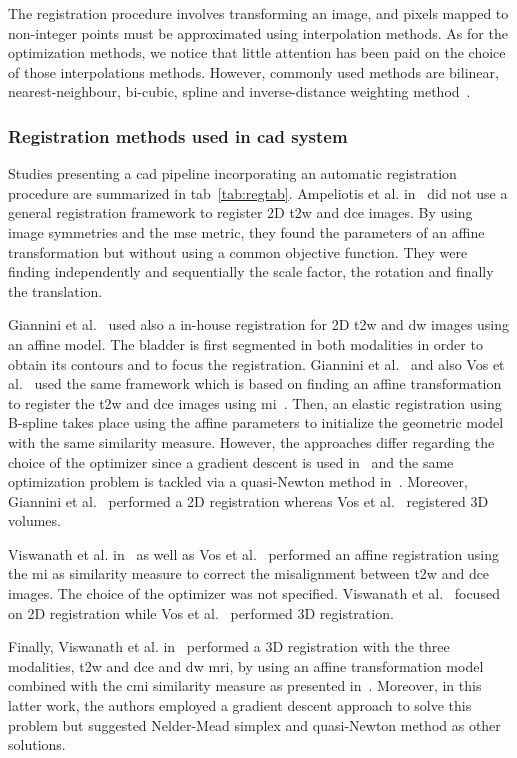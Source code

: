 The registration procedure involves transforming an image, and pixels mapped to non-integer points must be approximated using interpolation methods. As for the optimization methods, we notice that little attention has been paid on the choice of those interpolations methods. However, commonly used methods are bilinear, nearest-neighbour, bi-cubic, spline and inverse-distance weighting method~\cite{Mitra2012}.

\subsubsection{Registration methods used in \ac{cad} system}\label{subsubsec:regrev}

Studies presenting a \ac{cad} pipeline incorporating an automatic registration procedure are summarized in \ac{tab}~\ref{tab:regtab}. 
Ampeliotis et al. in~\cite{Ampeliotis2007,Ampeliotis2008} did not use a general registration framework  to register 2D \ac{t2w} and \ac{dce} images. By using image symmetries and the \ac{mse} metric, they found the parameters of an affine transformation but without using a common objective function. They were finding independently and sequentially the scale factor, the rotation and finally the translation.

Giannini et al.~\cite{Giannini2013} used also a in-house registration for 2D \ac{t2w} and \ac{dw} images using an affine model. The bladder is first segmented in both modalities in order to obtain its contours and to focus the registration.
Giannini et al.~\cite{Giannini2013} and also Vos et al.~\cite{Vos2010} used the same framework which is based on finding an affine transformation to register the \ac{t2w} and \ac{dce} images using \ac{mi}~\cite{Rueckert1999}. Then, an elastic registration using B-spline takes place using the affine parameters to initialize the geometric model with the  same similarity measure. However, the approaches differ regarding the choice of the optimizer since a gradient descent is used in~\cite{Giannini2013} and the same optimization problem is tackled via a quasi-Newton method in~\cite{Vos2010}. Moreover, Giannini et al.~\cite{Giannini2013} performed a 2D registration whereas Vos et al.~\cite{Vos2010} registered 3D volumes.

Viswanath et al. in~\cite{Viswanath2008a,Viswanath2009} as well as Vos et al.~\cite{Vos2008} performed an affine registration using the \ac{mi} as similarity measure to correct the misalignment between \ac{t2w} and \ac{dce} images. The choice of the optimizer was not specified. Viswanath et al.~\cite{Viswanath2008a,Viswanath2009} focused on 2D registration while Vos et al.~\cite{Vos2008} performed 3D registration.

Finally, Viswanath et al. in~\cite{Viswanath2011} performed a 3D registration with the three modalities, \ac{t2w} and \ac{dce} and \ac{dw} \ac{mri}, by using an affine transformation model combined with the \ac{cmi} similarity measure as presented in~\cite{Chappelow2011}. Moreover, in this latter work, the authors employed a gradient descent approach to solve this problem but suggested Nelder-Mead simplex and quasi-Newton method as other solutions.

